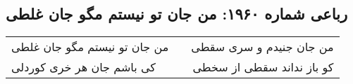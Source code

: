 \begin{center}
\section*{رباعی شماره ۱۹۶۰: من جان تو نیستم مگو جان غلطی}
\label{sec:1960}
\begin{longtable}{l p{0.5cm} r}
من جان تو نیستم مگو جان غلطی
&&
من جان جنیدم و سری سقطی
\\
کی باشم جان هر خری کوردلی
&&
کو باز نداند سقطی از سخطی
\\
\end{longtable}
\end{center}
